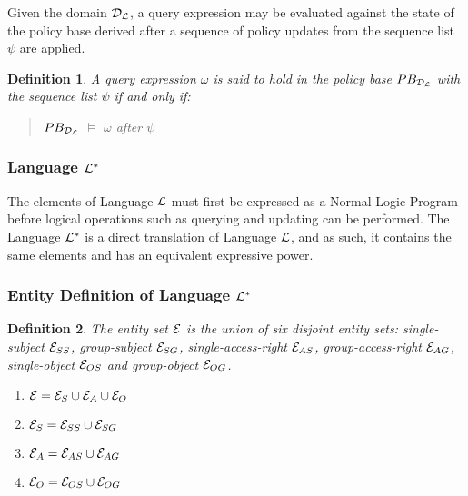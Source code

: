 \documentclass[10pt, twocolumn]{article}
\newtheorem{definition}{Definition}
\begin{document}
        Given the domain ${\cal D}_{\cal L}$, a query expression may be
        evaluated against the state of the policy base derived after a sequence
        of policy updates from the sequence list $\psi$ are applied.

        \begin{definition}
          A query expression $\omega$ is said to hold in the policy base
          $PB_{{\cal D}_{\cal L}}$ with the sequence list $\psi$ if and only
          if:

          \begin{quote}
            $PB_{{\cal D}_{\cal L}}$ $\models$ $\omega$ after $\psi$
          \end{quote}
          
        \end{definition}

      \subsubsection{Language ${\cal L}^{*}$}

        The elements of Language ${\cal L}$ must first be expressed as a Normal
        Logic Program before logical operations such as querying and updating
        can be performed. The Language ${\cal L}^{*}$ is a direct translation
        of Language ${\cal L}$, and as such, it contains the same elements and
        has an equivalent expressive power.

      \subsubsection{Entity Definition of Language ${\cal L}^{*}$}

        \begin{definition}

          The entity set ${\cal E}$ is the union of six disjoint entity sets:
          single-subject ${\cal E}_{SS}$, group-subject ${\cal E}_{SG}$,
          single-access-right ${\cal E}_{AS}$, group-access-right
          ${\cal E}_{AG}$, single-object ${\cal E}_{OS}$ and group-object
          ${\cal E}_{OG}$.

          \begin{enumerate}
            \item
              ${\cal E} = {\cal E}_{S} \cup {\cal E}_{A} \cup {\cal E}_{O}$
            \item
              ${\cal E}_{S} = {\cal E}_{SS} \cup {\cal E}_{SG}$
            \item
              ${\cal E}_{A} = {\cal E}_{AS} \cup {\cal E}_{AG}$
            \item
              ${\cal E}_{O} = {\cal E}_{OS} \cup {\cal E}_{OG}$
          \end{enumerate}

        \end{definition}
\end{document}
